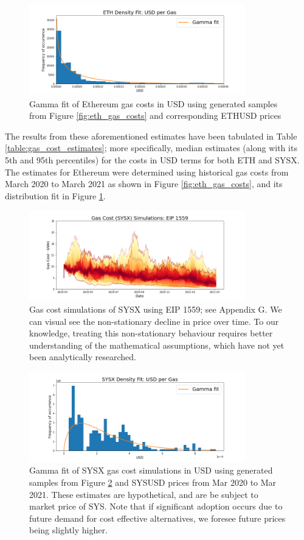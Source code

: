 \documentclass[peerreview]{ieeesyscoin}
\begin{document}
\begin{figure}[h!]
\includegraphics[width=3.7in]{img/eth_usd_density.png}
\caption{Gamma fit of Ethereum gas costs in USD using generated samples from Figure \ref{fig:eth_gas_costs} and corresponding ETHUSD prices} 
\label{fig:eth_usd_density}
\end{figure} 

The results from these aforementioned estimates have been tabulated in Table \ref{table:gas_cost_estimates}; more specifically, median estimates (along with its 5th and 95th percentiles) for the costs in USD terms for both ETH and SYSX. The estimates for Ethereum were determined using historical gas costs from March 2020 to March 2021 as shown in Figure \ref{fig:eth_gas_costs}, and its distribution fit in Figure \ref{fig:eth_usd_density}.

\begin{figure}[h!]
\includegraphics[width=3.7in]{img/sysx_gas_costs_eip_1559.png}
\caption{Gas cost simulations of SYSX using EIP 1559; see Appendix G. We can visual see the non-stationary decline in price over time. To our knowledge, treating this non-stationary behaviour requires better understanding of the mathematical assumptions, which have not yet been analytically researched.} 
\label{fig:sysx_gas_costs_eip_1559}
\end{figure} 

\begin{figure}[h!]
\includegraphics[width=3.7in]{img/sysx_usd_density.png}
\caption{Gamma fit of SYSX gas cost simulations in USD using generated samples from Figure \ref{fig:sysx_gas_costs_eip_1559} and SYSUSD prices from Mar 2020 to Mar 2021. These estimates are hypothetical, and are be subject to market price of SYS. Note that if significant adoption occurs due to future demand for cost effective alternatives, we foresee future prices being slightly higher.} 
\label{fig:sysx_usd_density}
\end{figure} 
\end{document}
